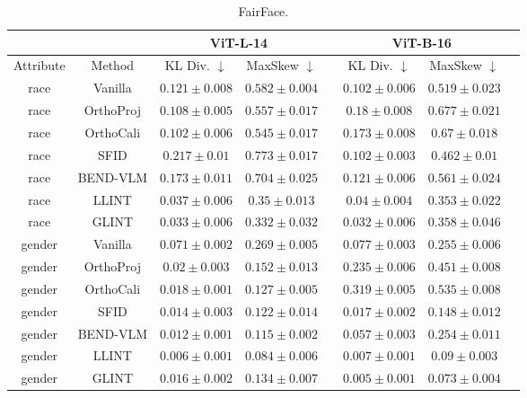 \begin{table}
\centering
\begin{tabular}{cccccccc}
& &  \multicolumn{2}{c}{\textbf{ViT-L-14}} && \multicolumn{2}{c}{\textbf{ViT-B-16}} \\ \hline
Attribute & Method & KL Div. $\downarrow$ & MaxSkew $\downarrow$ && KL Div. $\downarrow$ & MaxSkew $\downarrow$\\\hline
race & Vanilla & $0.121 \pm 0.008$ & $0.582 \pm 0.004$& & $0.102 \pm 0.006$ & $0.519 \pm  0.023$\\
race & OrthoProj & $0.108 \pm 0.005$ & $0.557 \pm 0.017$& & $0.18 \pm 0.008$ & $0.677 \pm  0.021$\\
race & OrthoCali & $0.102 \pm 0.006$ & $0.545 \pm 0.017$& & $0.173 \pm 0.008$ & $0.67 \pm  0.018$\\
race & SFID & $0.217 \pm 0.01$ & $0.773 \pm 0.017$& & $0.102 \pm 0.003$ & $0.462 \pm  0.01$\\
race & BEND-VLM & $0.173 \pm 0.011$ & $0.704 \pm 0.025$& & $0.121 \pm 0.006$ & $0.561 \pm  0.024$\\
race & LLINT & $0.037 \pm 0.006$ & $0.35 \pm 0.013$& & $0.04 \pm 0.004$ & $0.353 \pm  0.022$\\
race & GLINT & $0.033 \pm 0.006$ & $0.332 \pm 0.032$& & $0.032 \pm 0.006$ & $0.358 \pm  0.046$\\ \hline
gender & Vanilla & $0.071 \pm 0.002$ & $0.269 \pm 0.005$& & $0.077 \pm 0.003$ & $0.255 \pm  0.006$\\
gender & OrthoProj & $0.02 \pm 0.003$ & $0.152 \pm 0.013$& & $0.235 \pm 0.006$ & $0.451 \pm  0.008$\\
gender & OrthoCali & $0.018 \pm 0.001$ & $0.127 \pm 0.005$& & $0.319 \pm 0.005$ & $0.535 \pm  0.008$\\
gender & SFID & $0.014 \pm 0.003$ & $0.122 \pm 0.014$& & $0.017 \pm 0.002$ & $0.148 \pm  0.012$\\
gender & BEND-VLM & $0.012 \pm 0.001$ & $0.115 \pm 0.002$& & $0.057 \pm 0.003$ & $0.254 \pm  0.011$\\
gender & LLINT & $0.006 \pm 0.001$ & $0.084 \pm 0.006$& & $0.007 \pm 0.001$ & $0.09 \pm  0.003$\\
gender & GLINT & $0.016 \pm 0.002$ & $0.134 \pm 0.007$& & $0.005 \pm 0.001$ & $0.073 \pm  0.004$\\ \hline
\end{tabular}
\caption{FairFace.}
\label{tab:methods_metrics}
\end{table}